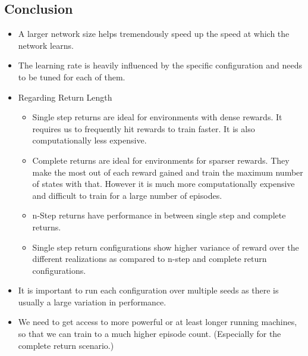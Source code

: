 \documentclass[A4]{article}
\begin{document}
    \subsection{Conclusion}\label{subsec:conclusions}
    \begin{itemize}
        \item A larger network size helps tremendously speed up the speed at which the network learns.
        \item The learning rate is heavily influenced by the specific configuration and needs to be tuned for each of them.
        \item Regarding Return Length \begin{itemize}
                                          \item Single step returns are ideal for environments with dense rewards. It requires us to frequently hit rewards to train faster. It is also computationally less expensive.
                                          \item Complete returns are ideal for environments for sparser rewards. They make the most out of each reward gained and train the maximum number of states with that. However it is much more computationally expensive and difficult to train for a large number of episodes.
                                          \item n-Step returns have performance in between single step and complete returns.
                                          \item Single step return configurations show higher variance of reward over the different realizations as compared to n-step and complete return configurations.
        \end{itemize}
        \item It is important to run each configuration over multiple seeds as there is usually a large variation in performance.
        \item We need to get access to more powerful or at least longer running machines, so that we can train to a much higher episode count.
        (Especially for the complete return scenario.)
    \end{itemize}
\end{document}

